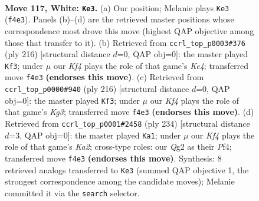 \documentclass[11pt]{article}
\begin{document}
\clearpage

\begin{figure}[p]\centering
\begin{subfigure}{0.46\textwidth}\centering
\resizebox{\linewidth}{!}{%
\newchessgame
\chessboard[
  setfen={5k2/8/8/8/5K2/8/6Q1/8 w - - 13 117},
  showmover=false,
  pgfstyle=straightmove, color=movearrow, markmove={f4-e3}
]}
\caption{}
\end{subfigure}\hfill
\begin{subfigure}{0.46\textwidth}\centering
\resizebox{\linewidth}{!}{%
\newchessgame
\chessboard[
  setfen={8/8/8/8/4K3/8/3Q4/6k1 w - - 6 109},
  showmover=false,
  pgfstyle=straightmove, color=movearrow, markmove={e4-f3}
]}
\caption{}
\end{subfigure}
\\[4pt]
\begin{subfigure}{0.46\textwidth}\centering
\resizebox{\linewidth}{!}{%
\newchessgame
\chessboard[
  setfen={8/k7/8/1Q6/8/6K1/8/8 w - - 3 109},
  showmover=false,
  pgfstyle=straightmove, color=movearrow, markmove={g3-f3}
]}
\caption{}
\end{subfigure}\hfill
\begin{subfigure}{0.46\textwidth}\centering
\resizebox{\linewidth}{!}{%
\newchessgame
\chessboard[
  setfen={8/8/8/8/1k3P2/8/K7/8 w - - 6 118},
  showmover=false,
  pgfstyle=straightmove, color=movearrow, markmove={a2-a1}
]}
\caption{}
\end{subfigure}
\caption{\textbf{Move 117, White: \texttt{Ke3}.} (a) Our position; Melanie plays \texttt{Ke3} (\texttt{f4e3}). Panels (b)--(d) are the retrieved master positions whose correspondence most drove this move (highest QAP objective among those that transfer to it). (b) Retrieved from \texttt{ccrl\_top\_p0003\#376} (ply 216) [structural distance $d$=0, QAP obj=0]: the master played \texttt{Kf3}; under $\mu$ our \emph{Kf4} plays the role of that game's \emph{Ke4}; transferred move \texttt{f4e3} \textbf{(endorses this move)}. (c) Retrieved from \texttt{ccrl\_top\_p0000\#940} (ply 216) [structural distance $d$=0, QAP obj=0]: the master played \texttt{Kf3}; under $\mu$ our \emph{Kf4} plays the role of that game's \emph{Kg3}; transferred move \texttt{f4e3} \textbf{(endorses this move)}. (d) Retrieved from \texttt{ccrl\_top\_p0001\#2458} (ply 234) [structural distance $d$=3, QAP obj=0]: the master played \texttt{Ka1}; under $\mu$ our \emph{Kf4} plays the role of that game's \emph{Ka2}; cross-type roles: our \emph{Q}g2 as their \emph{P}f4; transferred move \texttt{f4e3} \textbf{(endorses this move)}. Synthesis: 8 retrieved analogs transferred to \texttt{Ke3} (summed QAP objective 1, the strongest correspondence among the candidate moves); Melanie committed it via the \texttt{search} selector.}
\label{fig:thought-m232}
\end{figure}
\end{document}
